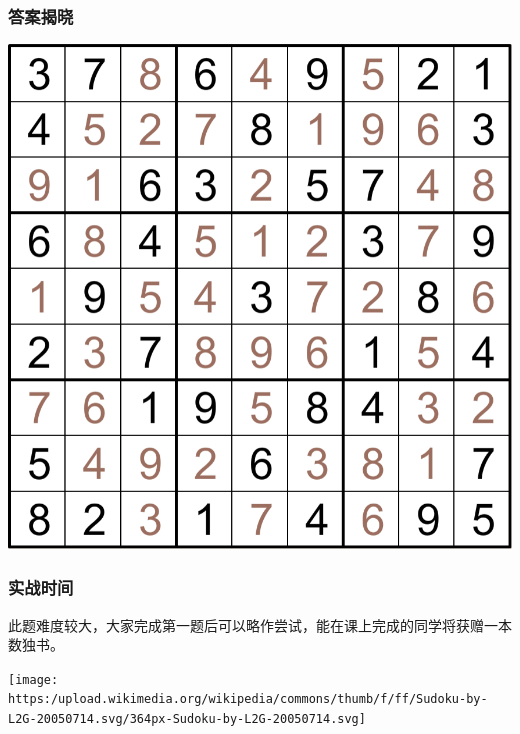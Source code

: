 \documentclass[xcolor=table]{beamer}
\begin{document}
\begin{mdframe}%

\frametitle{答案揭晓}\label{heading-section}%

\begin{mdcenter}%

\mdhr{}%

\noindent{}\includegraphics[keepaspectratio=true,height=\dimpx{450}]{images/sample2.2}{}%

\mdhr{}%
\end{mdcenter}%
\end{mdframe}\label{section}%

\noindent{} %

\begin{mdframe}%

\frametitle{实战时间}\label{heading-section}%

\begin{mdcenter}%

\noindent{}此题难度较大，大家完成第一题后可以略作尝试，能在课上完成的同学将获赠一本数独书。%

\mdhr{}%

\noindent{}\texttt{[image: https:/upload.wikimedia.org/wikipedia/commons/thumb/f/ff/Sudoku-by-L2G-20050714.svg/364px-Sudoku-by-L2G-20050714.svg]}{}%

\mdhr{}%
\end{mdcenter}%
\end{mdframe}\label{section}%
\end{document}
